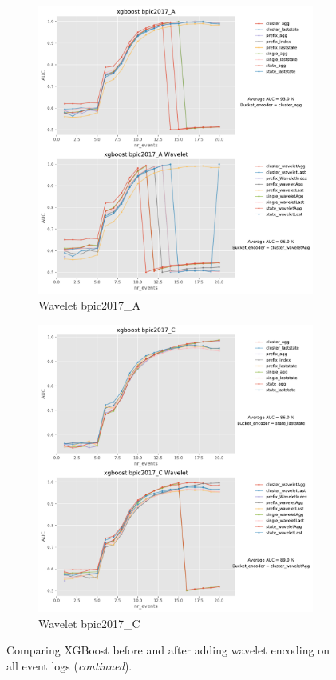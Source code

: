 \begin{figure}[!htbp]
	\begin{subfigure}{0.48\textwidth}
		\includegraphics[width=\linewidth]{images/wavelet/graphs2/bpic2017_A.pdf}
		\caption{Wavelet bpic2017\_A} \label{fig:b17aw}
	\end{subfigure}\hspace*{\fill}
	\begin{subfigure}{0.48\textwidth}
		\includegraphics[width=\linewidth]{images/wavelet/graphs2/bpic2017_C.pdf}
		\caption{Wavelet bpic2017\_C} \label{fig:b17cw}
	\end{subfigure}
	\caption{Comparing XGBoost before and after adding wavelet encoding on all event logs (\textit{continued}).}
	\label{fig:r2w}
\end{figure}


